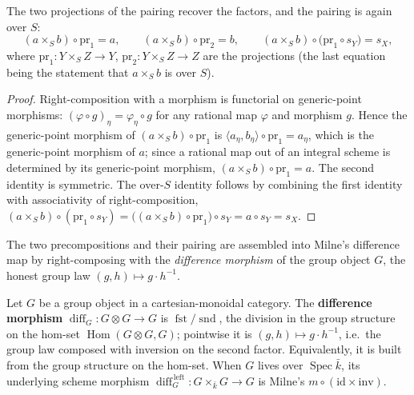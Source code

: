 \begin{lemma}\leanok
  \label{lem:rationalMap_prod_proj}
  The two projections of the pairing recover the factors, and the pairing is again over
  \(S\):
  \[
    (a \times_S b) \circ \mathrm{pr}_1 = a,
    \qquad
    (a \times_S b) \circ \mathrm{pr}_2 = b,
    \qquad
    (a \times_S b) \circ \bigl(\mathrm{pr}_1 \circ s_Y\bigr) = s_X,
  \]
  where \(\mathrm{pr}_1 \colon Y \times_S Z \to Y\), \(\mathrm{pr}_2 \colon Y \times_S Z \to Z\)
  are the projections (the last equation being the statement that \(a \times_S b\) is over
  \(S\)).
\end{lemma}
\begin{proof}\leanok
  Right-composition with a morphism is functorial on generic-point morphisms:
  \((\varphi \circ g)_\eta = \varphi_\eta \circ g\) for any rational map \(\varphi\) and
  morphism \(g\). Hence the generic-point morphism of \((a \times_S b) \circ \mathrm{pr}_1\) is
  \(\langle a_\eta, b_\eta\rangle \circ \mathrm{pr}_1 = a_\eta\), which is the generic-point
  morphism of \(a\); since a rational map out of an integral scheme is determined by its
  generic-point morphism, \((a \times_S b) \circ \mathrm{pr}_1 = a\). The second identity is
  symmetric. The over-\(S\) identity follows by combining the first identity with
  associativity of right-composition, \((a \times_S b) \circ (\mathrm{pr}_1 \circ s_Y) =
  \bigl((a \times_S b) \circ \mathrm{pr}_1\bigr) \circ s_Y = a \circ s_Y = s_X\).
\end{proof}

The two precompositions and their pairing are assembled into Milne's difference map by
right-composing with the \emph{difference morphism} of the group object \(G\), the honest
group law \((g,h) \mapsto g \cdot h^{-1}\).

\begin{definition}\leanok
  \label{def:grpObj_diff}
  Let \(G\) be a group object in a cartesian-monoidal category. The \textbf{difference
  morphism} \(\operatorname{diff}_G \colon G \otimes G \to G\) is
  \(\operatorname{fst} / \operatorname{snd}\), the division in the group structure on the
  hom-set \(\operatorname{Hom}(G \otimes G, G)\); pointwise it is
  \((g,h) \mapsto g \cdot h^{-1}\), i.e.\ the group law composed with inversion on the second
  factor. Equivalently, it is built from the group structure on the hom-set. When \(G\)
  lives over \(\operatorname{Spec}\bar k\), its underlying scheme morphism
  \(\operatorname{diff}_G^{\,\mathrm{left}} \colon G \times_{\bar k} G \to G\) is Milne's
  \(m \circ (\mathrm{id} \times \mathrm{inv})\).
\end{definition}

